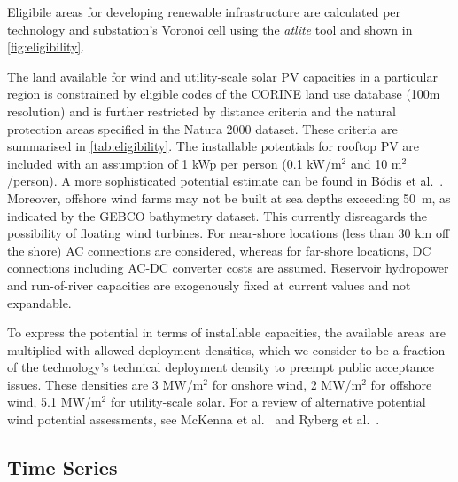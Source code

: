 Eligibile areas for developing renewable infrastructure are calculated per
technology and substation's Voronoi cell using the
\textit{atlite} tool and shown in
\cref{fig:eligibility}.

The land available for wind and utility-scale solar PV capacities in a
particular region is constrained by eligible codes of the
CORINE land use database (100m
resolution)  and is further restricted by distance criteria and the natural
protection areas specified in the Natura
2000 dataset. These criteria are
summarised in \cref{tab:eligibility}. The installable potentials for rooftop PV
are included with an assumption of 1 kWp per person (0.1 kW/m$^2$ and 10
m$^2$/person). A more sophisticated potential estimate can be found in Bódis et
al.~. Moreover, offshore wind farms may
not be built at sea depths exceeding \SI{50}{\metre}, as indicated by the GEBCO
bathymetry dataset. This currently disreagards the
possibility of floating wind turbines.
For near-shore locations (less than 30 km off the shore) AC connections are
considered, whereas for far-shore locations, DC connections including AC-DC
converter costs are assumed. Reservoir hydropower and run-of-river capacities
are exogenously fixed at current values and not expandable.

To express the potential in terms of installable capacities, the available areas
are multiplied with allowed deployment densities, which we consider to be a
fraction of the technology's technical deployment density to preempt public
acceptance issues. These densities are 3 MW/m$^ 2$ for onshore wind, 2 MW/m$^2$
for offshore wind, 5.1 MW/m$^2$ for utility-scale solar. For a review of
alternative potential wind potential assessments, see McKenna et
al.~ and Ryberg et
al.~.



\subsection{Time Series}
\label{sec:si:renewable-ts}

